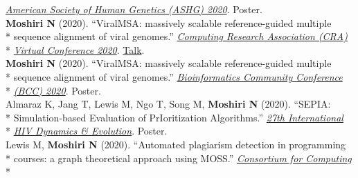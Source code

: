 \documentclass[margin,line]{res}
\begin{document}
\begin{resume}
\hspace*{7mm} \href{https://www.ashg.org/meetings/2020meeting}{\textit{American Society of Human Genetics (ASHG) 2020}}. Poster.\\
\hspace*{4mm} \textbf{Moshiri N} (2020). ``ViralMSA: massively scalable reference-guided multiple\\*
\hspace*{9.5mm} sequence alignment of viral genomes.'' \href{https://cra.org/events/cra-virtual-conference-2020/}{\textit{Computing Research Association (CRA)}}\\*\vspace{2mm}
\hspace*{8mm} \href{https://cra.org/events/cra-virtual-conference-2020/}{\textit{Virtual Conference 2020}}. \href{https://www.youtube.com/watch?v=PrAoks7OhE8&list=PL6AeXx75lHyyqKgfRmlSM4QUEna0dWDza&index=9&t=0s}{Talk}.\\
\hspace*{4mm} \textbf{Moshiri N} (2020). ``ViralMSA: massively scalable reference-guided multiple\\*
\hspace*{9.5mm} sequence alignment of viral genomes.'' \href{https://bcc2020.github.io/}{\textit{Bioinformatics Community Conference}}\\*\vspace{2mm}
\hspace*{8mm} \href{https://bcc2020.github.io/}{\textit{(BCC) 2020}}. Poster.\\
\hspace*{4mm} Almaraz K, Jang T, Lewis M, Ngo T, Song M, \textbf{Moshiri N} (2020). ``SEPIA:\\*
\hspace*{9.5mm} Simulation-based Evaluation of PrIoritization Algorithms.'' \href{https://cme.ucsd.edu/hivdynamics/}{\textit{27th International}}\\*\vspace{2mm}
\hspace*{8mm} \href{https://cme.ucsd.edu/hivdynamics/}{\textit{HIV Dynamics \& Evolution}}. Poster.\\
\hspace*{4mm} Lewis M, \textbf{Moshiri N} (2020). ``Automated plagiarism detection in programming\\*
\hspace*{9.5mm} courses: a graph theoretical approach using MOSS.'' \href{http://ccsc.org/southwestern/2020/index.php}{\textit{Consortium for Computing}}\\*\vspace{2mm}

\end{resume}
\end{document}
